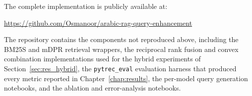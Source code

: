 The complete implementation is publicly available at:

\begin{center}
\url{https://github.com/Osmanoor/arabic-rag-query-enhancement}
\end{center}

\noindent The repository contains the components not reproduced above, including
the BM25S and mDPR retrieval wrappers, the reciprocal rank fusion and convex
combination implementations used for the hybrid experiments of
Section~\ref{sec:res_hybrid}, the \texttt{pytrec\_eval} evaluation harness that
produced every metric reported in Chapter~\ref{chap:results}, the per-model query
generation notebooks, and the ablation and error-analysis notebooks.
